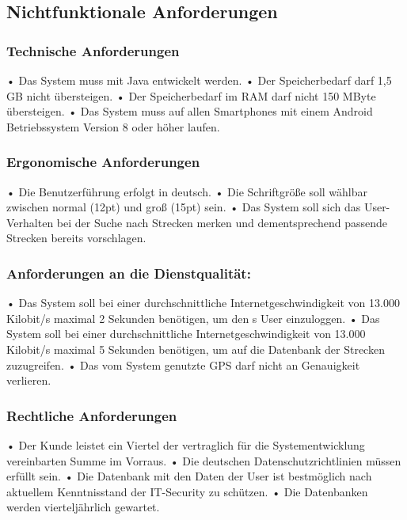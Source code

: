 \documentclass[a4paper, 12pp]{article}
\begin{document}
\subsection{Nichtfunktionale Anforderungen}
\subsubsection{Technische Anforderungen}
\label{technAnf}
• Das System muss mit Java entwickelt werden.\newline
• Der Speicherbedarf darf 1,5 GB nicht übersteigen.\newline
• Der Speicherbedarf im RAM darf nicht 150 MByte übersteigen.\newline
• Das System muss auf allen Smartphones mit einem Android Betriebssystem Version 8 oder höher laufen.
\subsubsection{Ergonomische Anforderungen}
• Die Benutzerführung erfolgt in deutsch.\newline
\label{Lesbarkeit}
• Die Schriftgröße soll wählbar zwischen normal (12pt) und groß (15pt) sein.\newline
\label{Vorschlaege}
• Das System soll sich das User-Verhalten bei der Suche nach Strecken merken und dementsprechend passende Strecken bereits vorschlagen.
\subsubsection{Anforderungen an die Dienstqualität:}
\label{Warten}
• Das System soll bei einer durchschnittliche Internetgeschwindigkeit von 13.000 Kilobit/s maximal 2 Sekunden benötigen, um den s User einzuloggen.\newline
• Das System soll bei einer durchschnittliche Internetgeschwindigkeit von 13.000 Kilobit/s maximal 5 Sekunden benötigen, um auf die Datenbank der Strecken zuzugreifen.\newline
• Das vom System genutzte GPS darf nicht an Genauigkeit verlieren.
\subsubsection{Rechtliche Anforderungen}
• Der Kunde leistet ein Viertel der vertraglich für die Systementwicklung vereinbarten Summe im Vorraus.\newline
\label{Datenschutz}
• Die deutschen Datenschutzrichtlinien müssen erfüllt sein.\newline
\label{Sicherheit}
• Die Datenbank mit den Daten der User ist bestmöglich nach aktuellem Kenntnisstand der IT-Security zu schützen.\newline
• Die Datenbanken werden vierteljährlich gewartet.
\end{document}
